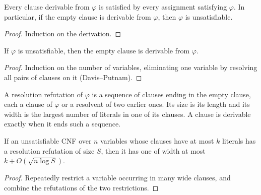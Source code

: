 \begin{theorem}
  \label{thm:lowerbounds-resolution-sound}
  \leanok
  Every clause derivable from $\varphi$ is satisfied by every assignment
  satisfying $\varphi$. In particular, if the empty clause is derivable from
  $\varphi$, then $\varphi$ is unsatisfiable.
\end{theorem}
\begin{proof}
  \leanok
  Induction on the derivation.
\end{proof}

\begin{theorem}
  \label{thm:lowerbounds-resolution-complete}
  If $\varphi$ is unsatisfiable, then the empty clause is derivable from
  $\varphi$.
\end{theorem}
\begin{proof}
  Induction on the number of variables, eliminating one variable by resolving
  all pairs of clauses on it (Davis--Putnam).
\end{proof}

\begin{definition}
  \label{def:lowerbounds-resolution-proof}
  A resolution refutation of $\varphi$ is a sequence of clauses ending in the
  empty clause, each a clause of $\varphi$ or a resolvent of two earlier ones.
  Its size is its length and its width is the largest number of literals in
  one of its clauses. A clause is derivable exactly when it ends such a
  sequence.
\end{definition}

\begin{theorem}
  \label{thm:lowerbounds-size-width}
  \notready
  If an unsatisfiable CNF over $n$ variables whose clauses have at most $k$
  literals has a resolution refutation of size $S$, then it has one of width at
  most $k + O(\sqrt{n \log S})$.
\end{theorem}
\begin{proof}
  Repeatedly restrict a variable occurring in many wide clauses, and combine
  the refutations of the two restrictions.
\end{proof}

